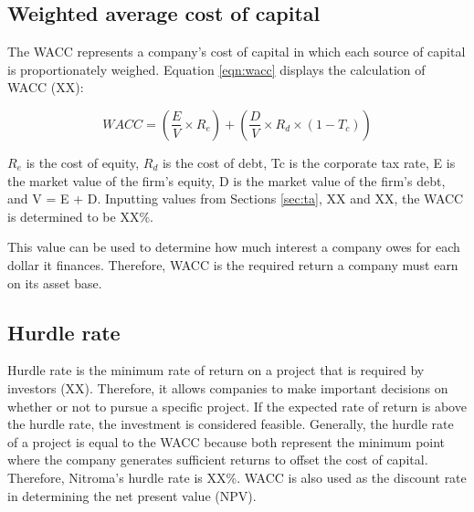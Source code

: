 \subsection{Weighted average cost of capital}
\label{sec:wacc}
The WACC represents a company’s cost of capital in which each source of capital is proportionately weighed. Equation \ref{eqn:wacc} displays the calculation of WACC (XX):

\begin{equation}
\label{eqn:wacc}
    WACC=\left(\frac{E}{V}\times R_{e}\right)+\left(\frac{D}{V}\times R_{d}\times (1-T_{c})\right)
\end{equation}

$R_{e}$ is the cost of equity, $R_{d}$ is the cost of debt, Tc is the corporate tax rate, E is the market value of the firm’s equity, D is the market value of the firm’s debt, and V = E + D. Inputting values from Sections \ref{sec:ta}, XX and XX, the WACC is determined to be XX\%. 

This value can be used to determine how much interest a company owes for each dollar it finances. Therefore, WACC is the required return a company must earn on its asset base. 

\subsection{Hurdle rate}
Hurdle rate is the minimum rate of return on a project that is required by investors (XX). Therefore, it allows companies to make important decisions on whether or not to pursue a specific project. If the expected rate of return is above the hurdle rate, the investment is considered feasible. Generally, the hurdle rate of a project is equal to the WACC because both represent the minimum point where the company generates sufficient returns to offset the cost of capital. Therefore, Nitroma's hurdle rate is XX\%. WACC is also used as the discount rate in determining the net present value (NPV).